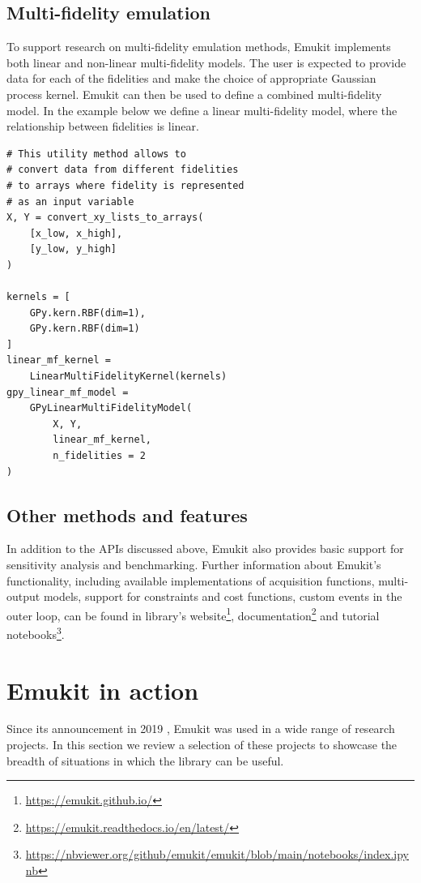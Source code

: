 \subsection{Multi-fidelity emulation}

To support research on multi-fidelity emulation methods, Emukit implements both linear and non-linear multi-fidelity models. The user is expected to provide data for each of the fidelities and make the choice of appropriate Gaussian process kernel. Emukit can then be used to define a combined multi-fidelity model. In the example below we define a linear multi-fidelity model, where the relationship between fidelities is linear.

\begin{verbatim}
# This utility method allows to
# convert data from different fidelities
# to arrays where fidelity is represented
# as an input variable
X, Y = convert_xy_lists_to_arrays(
    [x_low, x_high],
    [y_low, y_high]
)

kernels = [
    GPy.kern.RBF(dim=1),
    GPy.kern.RBF(dim=1)
]
linear_mf_kernel =
    LinearMultiFidelityKernel(kernels)
gpy_linear_mf_model =
    GPyLinearMultiFidelityModel(
        X, Y,
        linear_mf_kernel,
        n_fidelities = 2
)
\end{verbatim}

\subsection{Other methods and features}
In addition to the APIs discussed above, Emukit also provides basic support for sensitivity analysis and benchmarking. Further information about Emukit's functionality, including available implementations of acquisition functions, multi-output models, support for constraints and cost functions, custom events in the outer loop, can be found in library's website\footnote{\url{https://emukit.github.io/}}, documentation\footnote{\url{https://emukit.readthedocs.io/en/latest/}} and tutorial notebooks\footnote{\url{https://nbviewer.org/github/emukit/emukit/blob/main/notebooks/index.ipynb}}. 

\section{Emukit in action}
Since its announcement in 2019 \cite{paleyes2019emulation}, Emukit was used in a wide range of research projects. In this section we review a selection of these projects to showcase the breadth of situations in which the library can be useful.

